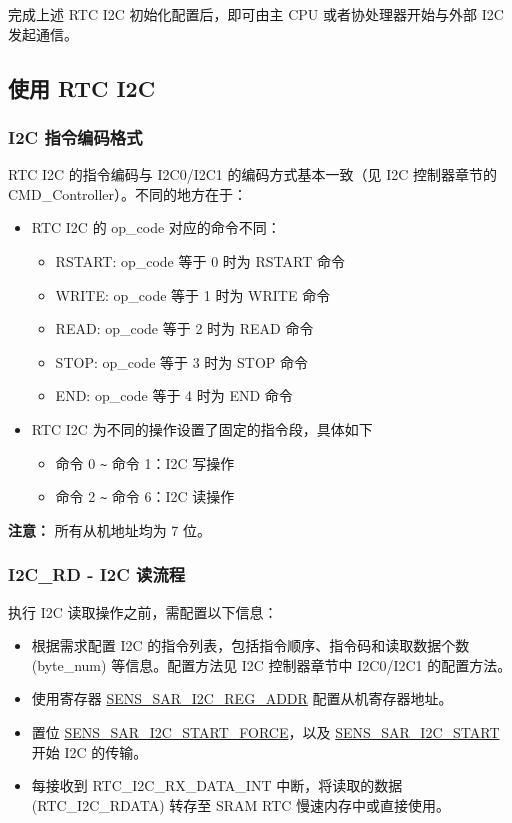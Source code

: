 \documentclass[main\_\_CN.tex]{subfiles}
\begin{document}
完成上述 RTC I2C 初始化配置后，即可由主 CPU 或者协处理器开始与外部 I2C 发起通信。

\subsection{使用 RTC I2C}

\subsubsection{I2C 指令编码格式}

RTC I2C 的指令编码与 I2C0/I2C1 的编码方式基本一致（见 I2C 控制器章节的 CMD\_Controller）。不同的地方在于：
\begin{itemize}
    \item RTC I2C 的 op\_code 对应的命令不同：
    \begin{itemize}
        \item RSTART: op\_code 等于 0 时为 RSTART 命令
        \item WRITE: op\_code 等于 1 时为 WRITE 命令
        \item READ: op\_code 等于 2 时为 READ 命令
        \item STOP: op\_code 等于 3 时为 STOP 命令
        \item END: op\_code 等于 4 时为 END 命令
    \end{itemize}
    \item RTC I2C 为不同的操作设置了固定的指令段，具体如下
    \begin{itemize}
        \item 命令 0 \verb+~+ 命令 1：I2C 写操作
        \item 命令 2 \verb+~+ 命令 6：I2C 读操作
    \end{itemize}
\end{itemize}
\textbf{注意：}
所有从机地址均为 7 位。


\subsubsection{I2C\_RD - I2C 读流程}

执行 I2C 读取操作之前，需配置以下信息：

\begin{itemize}
    \item 根据需求配置 I2C 的指令列表，包括指令顺序、指令码和读取数据个数 (byte\_num) 等信息。配置方法见 I2C 控制器章节中 I2C0/I2C1 的配置方法。
    \item 使用寄存器  \hyperref[fielddesc:SENSSARI2CREGADDR]{SENS\_SAR\_I2C\_REG\_ADDR} 配置从机寄存器地址。
    \item 置位 \hyperref[fielddesc:SENSSARI2CSTARTFORCE]{SENS\_SAR\_I2C\_START\_FORCE}，以及 \hyperref[fielddesc:SENSSARI2CSTART]{SENS\_SAR\_I2C\_START} 开始 I2C 的传输。
    \item 每接收到 RTC\_I2C\_RX\_DATA\_INT 中断，将读取的数据 (RTC\_I2C\_RDATA) 转存至 SRAM RTC 慢速内存中或直接使用。
\end{itemize}
\end{document}
